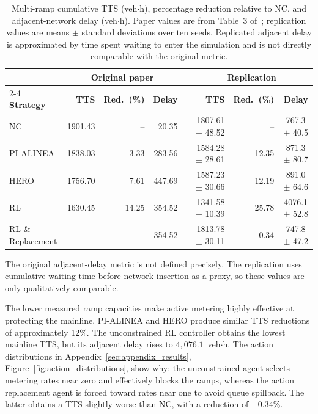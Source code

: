 \begin{table}[t]
\centering
\caption{Multi-ramp cumulative TTS (veh$\cdot$h), percentage reduction relative to NC, and adjacent-network delay (veh$\cdot$h). Paper values are from Table~3 of~\cite{Yang2025Reinforcement}; replication values are means $\pm$ standard deviations over ten seeds. Replicated adjacent delay is approximated by time spent waiting to enter the simulation and is not directly comparable with the original metric.}
\label{tab:multi_ramp_tts}
\begin{tabular}{lrrrcrrc}
\toprule
& \multicolumn{3}{c}{\textbf{Original paper}} & & \multicolumn{3}{c}{\textbf{Replication}} \\
\cmidrule{2-4} \cmidrule{6-8}
\textbf{Strategy} & \textbf{TTS} & \textbf{Red.~(\%)} & \textbf{Delay} & & \textbf{TTS} & \textbf{Red.~(\%)} & \textbf{Delay} \\
\midrule
NC                   & 1901.43 & --       & 20.35   & & 1807.61 $\pm$ 48.52  & --          & 767.3 $\pm$ 40.5   \\
PI-ALINEA            & 1838.03 & 3.33     & 283.56  & & 1584.28 $\pm$ 28.61  & 12.35       & 871.3 $\pm$ 80.7   \\
HERO                 & 1756.70 & 7.61     & 447.69  & & 1587.23 $\pm$ 30.66  & 12.19       & 891.0 $\pm$ 64.6   \\
RL                   & 1630.45 & 14.25    & 354.52  & & 1341.58 $\pm$ 10.39  & 25.78       & 4076.1 $\pm$ 52.8   \\
RL \& Replacement    & --      & --       & 354.52  & & 1813.78 $\pm$ 30.11  & -0.34       & 747.8 $\pm$ 47.2   \\
\bottomrule
\end{tabular}
\end{table}

The original adjacent-delay metric is not defined precisely. The replication uses cumulative waiting time before network insertion as a proxy, so these values are only qualitatively comparable.

The lower measured ramp capacities make active metering highly effective at protecting the mainline. PI-ALINEA and HERO produce similar TTS reductions of approximately 12\%. The unconstrained RL controller obtains the lowest mainline TTS, but its adjacent delay rises to $4{,}076.1$~veh$\cdot$h. The action distributions in Appendix~\ref{sec:appendix_results}, Figure~\ref{fig:action_distributions}, show why: the unconstrained agent selects metering rates near zero and effectively blocks the ramps, whereas the action replacement agent is forced toward rates near one to avoid queue spillback. The latter obtains a TTS slightly worse than NC, with a reduction of $-0.34\%$.

